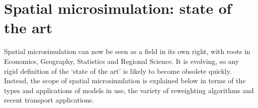 % 
% 
% 

\section{Spatial microsimulation: state of the art}
\label{s:sotart}
Spatial microsimulation can now be seen as a field in its own right, with roots
in Economics, Geography, Statistics and Regional Science.  It is
evolving, so any rigid definition of the `state of the art' is likely to become
obsolete quickly. Instead, the scope of spatial
microsimulation is explained below in terms of the types and applications of models
in use, the variety of reweighting algorithms and recent transport applications.

